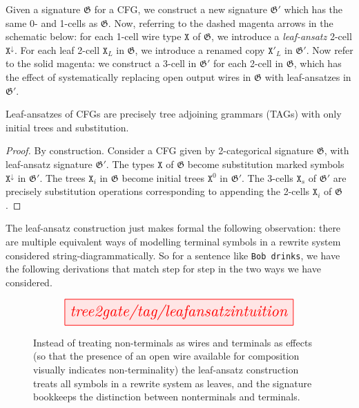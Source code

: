 \begin{construction}
Given a signature $\mathfrak{G}$ for a CFG, we construct a new signature $\mathfrak{G}'$ which has the same 0- and 1-cells as $\mathfrak{G}$. Now, referring to the dashed magenta arrows in the schematic below: for each 1-cell wire type $\texttt{X}$ of $\mathfrak{G}$, we introduce a \emph{leaf-ansatz} 2-cell $\texttt{X}^\downarrow$. For each leaf 2-cell $\texttt{X}_L$ in $\mathfrak{G}$, we introduce a renamed copy $\texttt{X}'_L$ in $\mathfrak{G}'$. Now refer to the solid magenta: we construct a 3-cell in $\mathfrak{G}'$ for each 2-cell in $\mathfrak{G}$, which has the effect of systematically replacing open output wires in $\mathfrak{G}$ with leaf-ansatzes in $\mathfrak{G}'$.
\end{construction}

\begin{proposition}\label{prop:cfgastag1}
Leaf-ansatzes of CFGs are precisely tree adjoining grammars (TAGs) with only initial trees and substitution.
\begin{proof}
By construction. Consider a CFG given by 2-categorical signature $\mathfrak{G}$, with leaf-ansatz signature $\mathfrak{G}'$. The types $\texttt{X}$ of $\mathfrak{G}$ become substitution marked symbols $\texttt{X}^{\downarrow}$ in $\mathfrak{G}'$. The trees $\texttt{X}_i$ in $\mathfrak{G}$ become initial trees $\texttt{X}^0$ in $\mathfrak{G}'$. The 3-cells $\texttt{X}_s$ of $\mathfrak{G}'$ are precisely substitution operations corresponding to appending the 2-cells $\texttt{X}_i$ of $\mathfrak{G}$.
\end{proof}
\end{proposition}

\clearpage

The leaf-ansatz construction just makes formal the following observation: there are multiple equivalent ways of modelling terminal symbols in a rewrite system considered string-diagrammatically. So for a sentence like \texttt{Bob drinks}, we have the following derivations that match step for step in the two ways we have considered.

\begin{figure}
\centering
\[\resizebox{0.75\textwidth}{!}{\tikzfig{tree2gate/tag/leafansatzintuition}}\]
\caption{Instead of treating non-terminals as wires and terminals as effects (so that the presence of an open wire available for composition visually indicates non-terminality) the leaf-ansatz construction treats all symbols in a rewrite system as leaves, and the signature bookkeeps the distinction between nonterminals and terminals.}
\end{figure}

